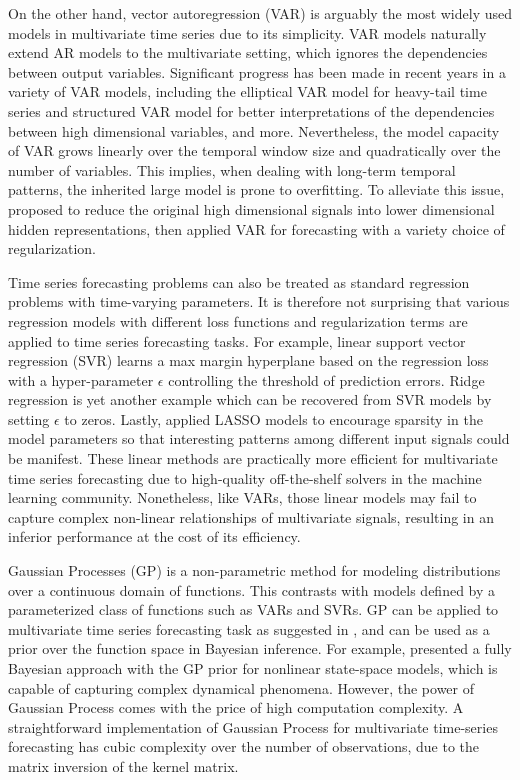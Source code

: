 On the other hand, vector autoregression (VAR) is arguably the most widely used models in multivariate time series \cite{hamilton1994time, box2015time, lutkepohl2005new} due to its simplicity. VAR models naturally extend AR models to the multivariate setting, which ignores the dependencies between output variables. Significant progress has been made in recent years in a variety of VAR models, including the elliptical VAR model \cite{qiu2015robust} for heavy-tail time series and structured VAR model \cite{melnyk2016estimating} for better interpretations of the dependencies between high dimensional variables, and more. Nevertheless, the model capacity of VAR grows linearly over the temporal window size and quadratically over the number of variables. This implies, when dealing with long-term temporal patterns, the inherited large model is prone to overfitting. To alleviate this issue, \cite{Yu_NIPS_16} proposed to reduce the original high dimensional signals into lower dimensional hidden representations, then applied VAR for forecasting with a variety choice of regularization.

Time series forecasting problems can also be treated as standard regression problems with time-varying parameters. It is therefore not surprising that various regression models with different loss functions and regularization terms are applied to time series forecasting tasks. For example, linear support vector regression (SVR) \cite{kim2003financial, cao2003support} learns a max margin hyperplane based on the regression loss with a hyper-parameter $\epsilon$ controlling the threshold of prediction errors. Ridge regression is yet another example which can be recovered from SVR models by setting $\epsilon$ to zeros. Lastly, \cite{li2014forecasting} applied LASSO models to encourage sparsity in the model parameters so that interesting patterns among different input signals could be manifest. These linear methods are practically more efficient for multivariate time series forecasting due to high-quality off-the-shelf solvers in the machine learning community. Nonetheless, like VARs, those linear models may fail to capture complex non-linear relationships of multivariate signals, resulting in an inferior performance at the cost of its efficiency.

Gaussian Processes (GP) is a non-parametric method for modeling distributions over a continuous domain of functions. This contrasts with models defined by a parameterized class of functions such as VARs and SVRs. GP can be applied to multivariate time series forecasting task as suggested in \cite{roberts2013gaussian}, and can be used as a prior over the function space in Bayesian inference. For example, \cite{frigola2013bayesian} presented a fully Bayesian approach with the GP prior for nonlinear state-space models, which is capable of capturing complex dynamical phenomena. However, the power of Gaussian Process comes with the price of high computation complexity. A straightforward implementation of Gaussian Process for multivariate time-series forecasting has cubic complexity over the number of observations, due to the matrix inversion of the kernel matrix.

